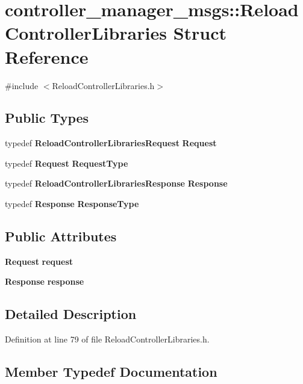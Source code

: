 \section{controller\-\_\-manager\-\_\-msgs\-:\-:\-Reload\-Controller\-Libraries \-Struct \-Reference}
\label{structcontroller__manager__msgs_1_1ReloadControllerLibraries}


{\ttfamily \#include $<$\-Reload\-Controller\-Libraries.\-h$>$}

\subsection*{\-Public \-Types}
\begin{DoxyCompactItemize}
\item 
typedef \*
{\bf \-Reload\-Controller\-Libraries\-Request} {\bf \-Request}
\item 
typedef {\bf \-Request} {\bf \-Request\-Type}
\item 
typedef \*
{\bf \-Reload\-Controller\-Libraries\-Response} {\bf \-Response}
\item 
typedef {\bf \-Response} {\bf \-Response\-Type}
\end{DoxyCompactItemize}
\subsection*{\-Public \-Attributes}
\begin{DoxyCompactItemize}
\item 
{\bf \-Request} {\bf request}
\item 
{\bf \-Response} {\bf response}
\end{DoxyCompactItemize}


\subsection{\-Detailed \-Description}


\-Definition at line 79 of file \-Reload\-Controller\-Libraries.\-h.



\subsection{\-Member \-Typedef \-Documentation}
